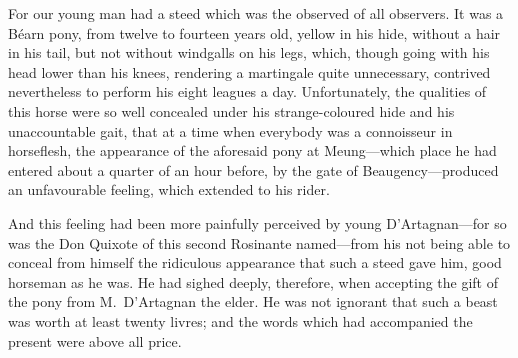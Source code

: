 For our young man had a steed which was the observed of all observers. It was a Béarn pony, from twelve to fourteen years old, yellow in his hide, without a hair in his tail, but not without windgalls on his legs, which, though going with his head lower than his knees, rendering a martingale quite unnecessary, contrived nevertheless to perform his eight leagues a day. Unfortunately, the qualities of this horse were so well concealed under his strange-coloured hide and his unaccountable gait, that at a time when everybody was a connoisseur in horseflesh, the appearance of the aforesaid pony at Meung—which place he had entered about a quarter of an hour before, by the gate of Beaugency—produced an unfavourable feeling, which extended to his rider. 

And this feeling had been more painfully perceived by young D'Artagnan—for so was the Don Quixote of this second Rosinante named—from his not being able to conceal from himself the ridiculous appearance that such a steed gave him, good horseman as he was. He had sighed deeply, therefore, when accepting the gift of the pony from M.~D'Artagnan the elder. He was not ignorant that such a beast was worth at least twenty livres; and the words which had accompanied the present were above all price. 

